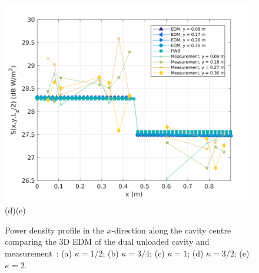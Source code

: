 \documentclass[a4paper]{article}
\numberwithin{equation}{section}
\begin{document}
\begin{figure}[hp]
\begin{center}
\includegraphics[width=0.49\linewidth]{figures/DDM-EEBC_3D_DU_PowerDensityProfileXMeas_JX_k2_0}\\
{\footnotesize (d)\hspace{75mm}(e)}\\
\vspace{-2mm}
\caption{\label{fg:measprofsduk} Power density profile in the $x$-direction along the cavity centre comparing
the 3D EDM of the dual unloaded cavity and measurement~\citep{Flintoft2017b}: (a) $\kappa=1/2$; (b) $\kappa=3/4$;
(c) $\kappa=1$; (d) $\kappa=3/2$; (e) $\kappa=2$.}
\end{center}
\end{figure}
\end{document}
